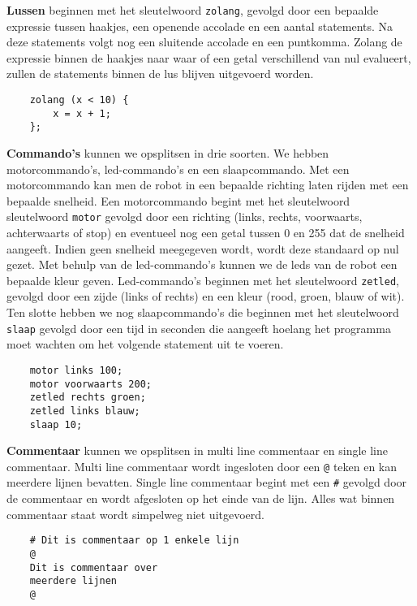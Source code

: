 \documentclass[12pt, titlepage]{article}
\makeatletter
\newcommand{\at}{\makeatletter @\makeatother}
\makeatother
\begin{document}
\begin{description}
\item{\bf Lussen} beginnen met het sleutelwoord \texttt{zolang}, gevolgd door een bepaalde expressie tussen haakjes, een openende accolade en een aantal statements. Na deze statements volgt nog een sluitende accolade en een puntkomma. Zolang de expressie binnen de haakjes naar waar of een getal verschillend van nul evalueert, zullen de statements binnen de lus blijven uitgevoerd worden.
\newline
\begin{lstlisting}
    zolang (x < 10) {
    	x = x + 1;
    };
\end{lstlisting}

\item{\bf Commando's} kunnen we opsplitsen in drie soorten. We hebben motorcommando's, led-commando's en een slaapcommando. Met een motorcommando kan men de robot in een bepaalde richting laten rijden met een bepaalde snelheid. Een motorcommando begint met het sleutelwoord sleutelwoord \texttt{motor} gevolgd door een richting (links, rechts, voorwaarts, achterwaarts of stop) en eventueel nog een getal tussen 0 en 255 dat de snelheid aangeeft. Indien geen snelheid meegegeven wordt, wordt deze standaard op nul gezet. Met behulp van de led-commando's kunnen we de leds van de robot een bepaalde kleur geven. Led-commando's beginnen met het sleutelwoord \texttt{zetled}, gevolgd door een zijde (links of rechts) en een kleur (rood, groen, blauw of wit). Ten slotte hebben we nog slaapcommando's die beginnen met het sleutelwoord \texttt{slaap} gevolgd door een tijd in seconden die aangeeft hoelang het programma moet wachten om het volgende statement uit te voeren.
\newline
\begin{lstlisting}
    motor links 100;
    motor voorwaarts 200;
    zetled rechts groen;
    zetled links blauw;
    slaap 10;
\end{lstlisting}

\item{\bf Commentaar} kunnen we opsplitsen in multi line commentaar en single line commentaar. Multi line commentaar wordt ingesloten door een \texttt{\at} teken en kan meerdere lijnen bevatten. Single line commentaar begint met een \texttt{\#} gevolgd door de commentaar en wordt afgesloten op het einde van de lijn. Alles wat binnen commentaar staat wordt simpelweg niet uitgevoerd.
\newline
\begin{lstlisting}
    # Dit is commentaar op 1 enkele lijn
    @
    Dit is commentaar over  
    meerdere lijnen
    @
\end{lstlisting}
\end{description}
\newpage
\end{document}
